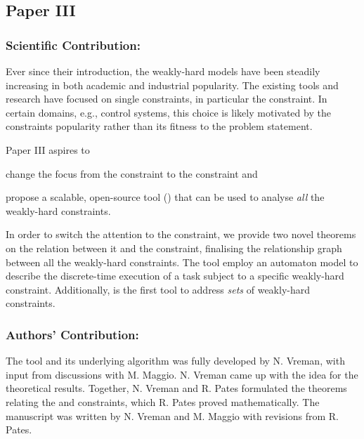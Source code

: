 \subsection*{Paper III}%
%
\begin{quote}
\end{quote}

\subsubsection*{Scientific Contribution:}%
%
Ever since their introduction, the weakly-hard models have been steadily increasing in both academic and industrial popularity.
The existing tools and research have focused on single constraints, in particular the \tAM{} constraint.
In certain domains, e.g., control systems, this choice is likely motivated by the \tAM{} constraints popularity rather than its fitness to the problem statement.

Paper III aspires to
\begin{enumerate*}[label=(\roman*)]
    \item change the focus from the \tAM{} constraint to the \tRH{} constraint and
    \item propose a scalable, open-source tool (\tool{}) that can be used to analyse \emph{all} the weakly-hard constraints. 
\end{enumerate*}
In order to switch the attention to the \tRH{} constraint, we provide two novel theorems on the relation between it and the \tAH{} constraint, finalising the relationship graph between all the weakly-hard constraints.
The \tool{} tool employ an automaton model to describe the discrete-time execution of a task subject to a specific weakly-hard constraint.
Additionally, \tool{} is the first tool to address \emph{sets} of weakly-hard constraints.

\subsubsection*{Authors' Contribution:}%
%
The tool and its underlying algorithm was fully developed by N. Vreman, with input from discussions with M. Maggio.
N. Vreman came up with the idea for the theoretical results.
Together, N. Vreman and R. Pates formulated the theorems relating the \tAH{} and \tRH{} constraints, which R. Pates proved mathematically.
The manuscript was written by N. Vreman and M. Maggio with revisions from R. Pates.  



